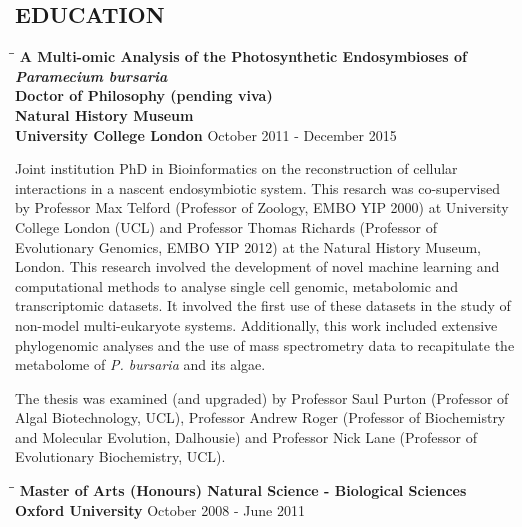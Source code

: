 \documentclass{res}
\begin{document}
\begin{resume}
        
\section{EDUCATION}          

\vspace{-0.05in}
\begin{tabbing}
   \hspace{2in}\= \hspace{2.6in}\= \kill 
   {\bf A Multi-omic Analysis of the Photosynthetic Endosymbioses of \textit{Paramecium bursaria}}\\
    {\bf Doctor of Philosophy (pending viva)}\\ 
    {\bf Natural History Museum}\\
    {\bf University College London
    } \>      \>October 2011 - December 2015\\

   \end{tabbing}\vspace{-20pt}  
   
   Joint institution PhD in Bioinformatics on the reconstruction of cellular interactions in a nascent endosymbiotic system.  This resarch was co-supervised by Professor Max Telford (Professor of Zoology, EMBO YIP 2000) at University College London (UCL) and Professor Thomas Richards (Professor of Evolutionary Genomics, EMBO YIP 2012) at the Natural History Museum, London.  
   This research involved the development of novel machine learning and computational methods
   to analyse single cell genomic, metabolomic and transcriptomic datasets.  
   It involved the first use of these datasets in the study of non-model multi-eukaryote systems.
   Additionally, this work included extensive phylogenomic analyses and the use of 
   mass spectrometry data
   to recapitulate the metabolome of \textit{P. bursaria} and its algae. 

   The thesis was examined (and upgraded) by 
   Professor Saul Purton (Professor of Algal Biotechnology, UCL), Professor Andrew Roger (Professor of Biochemistry and Molecular Evolution, Dalhousie) and Professor Nick Lane (Professor of Evolutionary Biochemistry, UCL).

\vspace{-0.1in}
 \begin{tabbing}
   \hspace{2in}\= \hspace{2.6in}\= \kill 
     {\bf Master of Arts (Honours) Natural Science - Biological Sciences}\\
    {\bf Oxford University
    } \>      \>October 2008 - June 2011\\
                          


\end{tabbing}
\end{resume}
\end{document}
